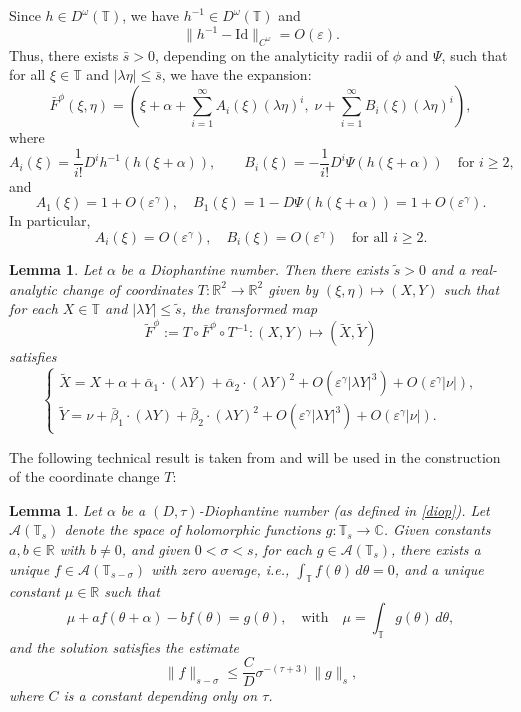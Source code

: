 \documentclass{amsart}
\newtheorem{Lemma}[Definition]{Lemma}
\theoremstyle{definition}
\begin{document}
Since $h \in D^\omega(\mathbb{T})$, we have $h^{-1} \in D^\omega(\mathbb{T})$ and
\[
\|h^{-1} - \mathrm{Id}\|_{C^\omega} = O(\varepsilon).
\]
Thus, there exists $\bar{s} > 0$, depending on the analyticity radii of $\phi$ and $\Psi$, such that for all $\xi \in \mathbb{T}$ and $|\lambda \eta| \leq \bar{s}$, we have the expansion:
\begin{equation}
\bar{F}^\phi(\xi, \eta) = \left(\xi + \alpha + \sum_{i=1}^\infty A_i(\xi)(\lambda \eta)^i,\; \nu + \sum_{i=1}^\infty B_i(\xi)(\lambda \eta)^i\right),
\end{equation}
where
\[
A_i(\xi) = \frac{1}{i!} D^i h^{-1}(h(\xi + \alpha)), \qquad
B_i(\xi) = -\frac{1}{i!} D^i \Psi(h(\xi + \alpha)) \quad \text{for } i \geq 2,
\]
and
\[
A_1(\xi) = 1 + O(\varepsilon^\gamma), \quad B_1(\xi) = 1 - D\Psi(h(\xi + \alpha)) = 1 + O(\varepsilon^\gamma).
\]
In particular,
\[
A_i(\xi) = O(\varepsilon^\gamma), \quad B_i(\xi) = O(\varepsilon^\gamma) \quad \text{for all } i \geq 2.
\]

\begin{Lemma}\label{ketra}
Let $\alpha$ be a Diophantine number. Then there exists $\tilde{s} > 0$ and a real-analytic change of coordinates $T: \mathbb{R}^2 \to \mathbb{R}^2$ given by $(\xi, \eta) \mapsto (X, Y)$ such that for each $X \in \mathbb{T}$ and $|\lambda Y| \leq \tilde{s}$, the transformed map
\[
\tilde{F}^\phi := T \circ \bar{F}^\phi \circ T^{-1} : (X, Y) \mapsto (\tilde{X}, \tilde{Y})
\]
satisfies
\[
\left\{
\begin{array}{l}
\tilde{X} = X + \alpha + \bar{\alpha}_1 \cdot (\lambda Y) + \bar{\alpha}_2 \cdot (\lambda Y)^2 + O(\varepsilon^\gamma |\lambda Y|^3) + O(\varepsilon^\gamma |\nu|), \\
\tilde{Y} = \nu + \bar{\beta}_1 \cdot (\lambda Y) + \bar{\beta}_2 \cdot (\lambda Y)^2 + O(\varepsilon^\gamma |\lambda Y|^3) + O(\varepsilon^\gamma |\nu|).
\end{array}
\right.
\]
\end{Lemma}

The following technical result is taken from \cite[Lemma B.1]{Ma} and will be used in the construction of the coordinate change $T$:

\begin{Lemma}\label{jsl}
Let $\alpha$ be a $(D, \tau)$-Diophantine number (as defined in \eqref{diop}). Let $\mathcal{A}(\mathbb{T}_s)$ denote the space of holomorphic functions $g: \mathbb{T}_s \to \mathbb{C}$. Given constants $a, b \in \mathbb{R}$ with $b \neq 0$, and given $0 < \sigma < s$, for each $g \in \mathcal{A}(\mathbb{T}_s)$, there exists a unique $f \in \mathcal{A}(\mathbb{T}_{s - \sigma})$ with zero average, i.e., $\int_\mathbb{T} f(\theta)\, d\theta = 0$, and a unique constant $\mu \in \mathbb{R}$ such that
\[
\mu + a f(\theta + \alpha) - b f(\theta) = g(\theta), \quad \text{with} \quad \mu = \int_\mathbb{T} g(\theta)\, d\theta,
\]
and the solution satisfies the estimate
\[
\|f\|_{s-\sigma} \leq \frac{C}{D} \sigma^{-(\tau + 3)} \|g\|_s,
\]
where $C$ is a constant depending only on $\tau$.
\end{Lemma}
\end{document}
